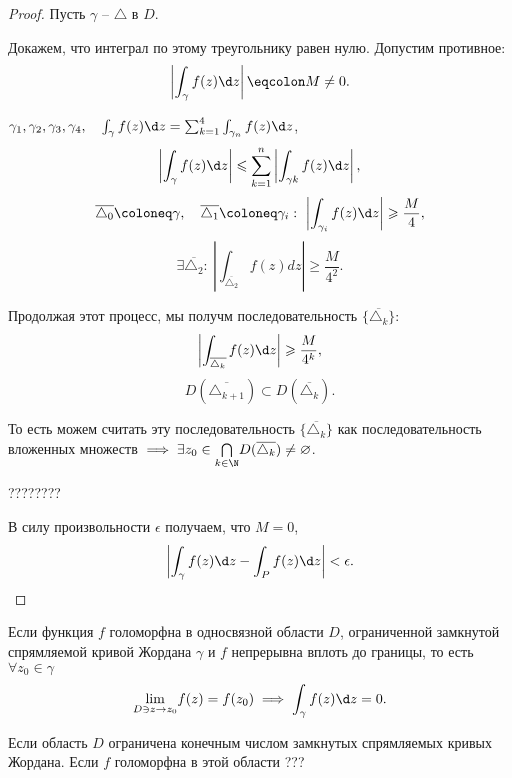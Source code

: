 \begin{proof}
	Пусть $\gamma $ -- $\triangle$ в $D$.
	\begin{figure}[H]
		\centering
		\label{fig:fig-15}
	\end{figure}

	Докажем, что интеграл по этому треугольнику равен нулю. Допустим противное:
	\[
		\left|\int_{\gamma } f(z)\d z\right| \eqcolon M \ne 0.
	\]

	$\gamma _1, \gamma _2, \gamma _3, \gamma _4, \quad \int_{\gamma } f(z)\d z = \sum_{k=1}^{4} \int_{\gamma _n} f(z)\d z$,
	\[
		\left|\int_{\gamma } f(z)\d z\right| \leqslant \sum_{k=1}^{n} \left|\int_{\gamma k} f(z)\d z\right|,
	\]
	\[
		\overline{\triangle_0} \coloneq \gamma , \quad \overline{\triangle_1} \coloneq \gamma _i : \ \left|\int_{\gamma _i} f(z)\d z\right| \geqslant  \frac{M}{4} ,
	\]
	\[
		\exists \overline{\triangle_2} : \ \left|\int_{\overline{\triangle_2} }f(z)dz \right| \geqslant  \frac{M}{4^2} .
	\]

	Продолжая этот процесс, мы получм последовательность $\{\overline{\triangle_k} \}:$
	\[
		\left|\int_{\overline{\triangle_k} } f(z)\d z\right| \geqslant \frac{M}{4^k} ,
	\]
	\[
		D(\overline{\triangle_{k+1} } ) \subset D(\overline{\triangle_k} ).
	\]

	То есть можем считать эту последовательность $\{\overline{\triangle_k} \}$ как последовательность вложенных множеств $\implies \exists z_0 \in \underset{k \in \N}{\bigcap} D(\overline{\triangle_k} ) \ne \varnothing $.

	????????

	В силу произвольности $\epsilon $ получаем, что $M = 0$,
	\[
		\left|\int_{\gamma } f(z)\d z - \int_{P} f(z)\d z\right| < \epsilon .
	\]
\end{proof}

\begin{theorem}
	Если функция $f$ голоморфна в односвязной области $D$, ограниченной замкнутой спрямляемой кривой Жордана $\gamma $ и $f$ непрерывна вплоть до границы, то есть $\forall z_0 \in \gamma $
	\[
		\underset{D \ni z \rightarrow z_0}{\lim} f(z) = f(z_0) \implies \int_{\gamma } f(z)\d z = 0.
	\]
\end{theorem}

\begin{corollary}
	Если область $D$ ограничена конечным числом замкнутых спрямляемых кривых Жордана. Если $f$ голоморфна в этой области ???
\end{corollary}

